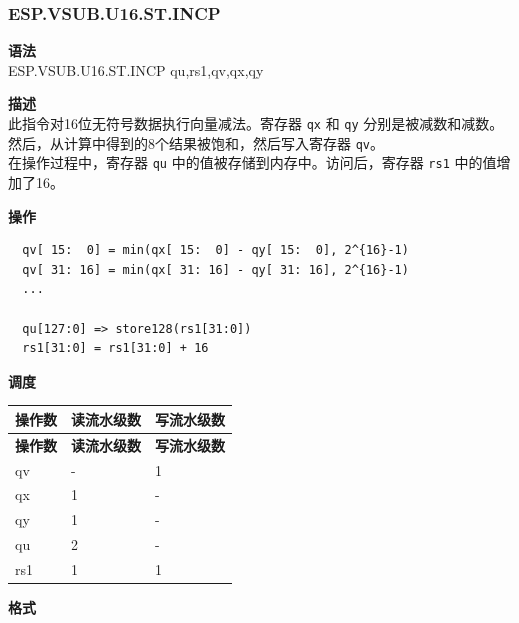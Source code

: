 \newpage
\subsubsection{ESP.VSUB.U16.ST.INCP}\label{instruction:ESPVSUBU16STINCP}
\textbf{语法}\\
ESP.VSUB.U16.ST.INCP qu,rs1,qv,qx,qy

\textbf{描述}\\
此指令对16位无符号数据执行向量减法。寄存器 \lstinline{qx} 和 \lstinline{qy} 分别是被减数和减数。然后，从计算中得到的8个结果被饱和，然后写入寄存器 \lstinline{qv}。\\ 在操作过程中，寄存器 \lstinline{qu} 中的值被存储到内存中。访问后，寄存器 \lstinline{rs1} 中的值增加了16。

\textbf{操作}\\
\begin{lstlisting}
  qv[ 15:  0] = min(qx[ 15:  0] - qy[ 15:  0], 2^{16}-1)
  qv[ 31: 16] = min(qx[ 31: 16] - qy[ 31: 16], 2^{16}-1)
  ...

  qu[127:0] => store128(rs1[31:0])
  rs1[31:0] = rs1[31:0] + 16
\end{lstlisting}


\textbf{调度}\\
\begin{longtable}[c]{|l|l|l|}
    \hline
    \rowcolor{lightgray}
    \textbf{操作数} & \textbf{读流水级数} & \textbf{写流水级数} \\\hline
    \endfirsthead
    \hline
    \rowcolor{lightgray}
     \textbf{操作数} & \textbf{读流水级数} & \textbf{写流水级数} \\\hline
    \endhead
    \hline
    \endfoot

  qv & - & 1 \\\hline
    qx & 1 & - \\\hline
    qy & 1 & - \\\hline
    qu & 2 & - \\\hline
    rs1 & 1 & 1

\end{longtable}

\textbf{格式}\\

